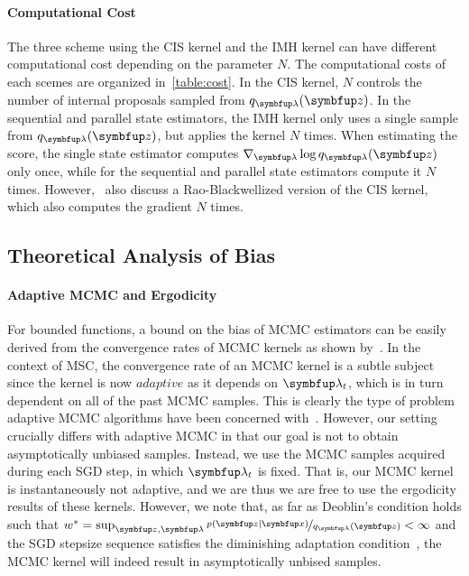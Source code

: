 \paragraph{Computational Cost}
The three scheme using the CIS kernel and the IMH kernel can have different computational cost depending on the parameter \(N\).
The computational costs of each scemes are organized in~\cref{table:cost}.
In the CIS kernel, \(N\) controls the number of internal proposals sampled from \(q_{\vlambda}(\vz)\).
In the sequential and parallel state estimators, the IMH kernel only uses a single sample from \(q_{\vlambda}(\vz)\), but applies the kernel \(N\) times.
When estimating the score, the single state estimator computes \(\nabla_{\vlambda} \log q_{\vlambda}(\vz)\) only once, while for the sequential and parallel state estimators compute it \(N\) times.
However,~\cite{NEURIPS2020_b2070693} also discuss a Rao-Blackwellized version of the CIS kernel, which also computes the gradient \(N\) times.

\subsection{Theoretical Analysis of Bias}\label{section:theory}
\vspace{-0.05in}
\paragraph{Adaptive MCMC and Ergodicity}
For bounded functions, a bound on the bias of MCMC estimators can be easily derived from the convergence rates of MCMC kernels as shown by~\citet[Theorem 4]{jiang_mcmc_2021}.
In the context of MSC, the convergence rate of an MCMC kernel is a subtle subject since the kernel is now \(adaptive\) as it depends on \(\vlambda_t\), which is in turn dependent on all of the past MCMC samples.
This is clearly the type of problem adaptive MCMC algorithms have been concerned with~\citep{andrieu_ergodicity_2006}.
However, our setting crucially differs with adaptive MCMC in that our goal is not to obtain asymptotically unbiased samples.
Instead, we use the MCMC samples acquired during each SGD step, in which \(\vlambda_t\) is fixed.
That is, our MCMC kernel is instantaneously not adaptive, and we are thus we are free to use the ergodicity results of these kernels.
However, we note that, as far as Deoblin's condition holds such that \(w^* = \sup_{\vz, \vlambda} \nicefrac{p\left(\vz\mid\vx\right)}{q_{\vlambda}\left(\vz\right)}  < \infty\) and the SGD stepsize sequence satisfies the diminishing adaptation condition~\citep{10.2307/27595854}, the MCMC kernel will indeed result in asymptotically unbised samples.

